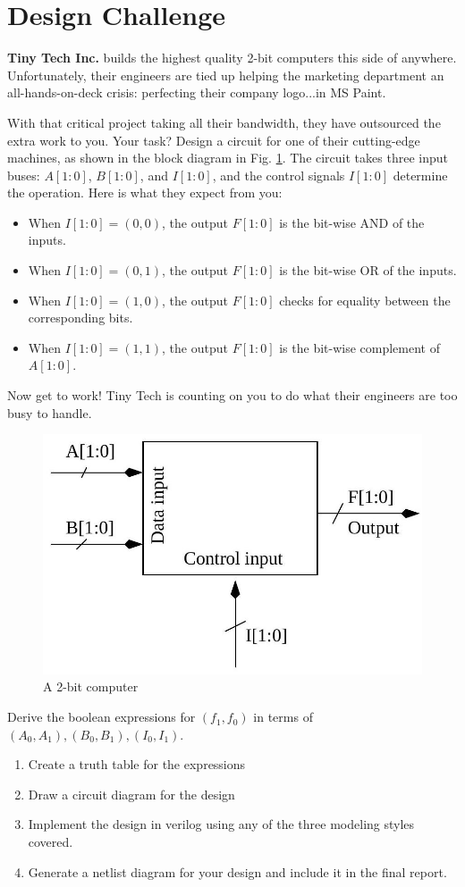 \documentclass[12pt]{labmanual}
\begin{document}
\section{Design Challenge}


\textbf{Tiny Tech Inc.} builds the highest quality 2-bit computers this side of anywhere. Unfortunately, their engineers are tied up helping the marketing department an all-hands-on-deck crisis: perfecting their company logo...in MS Paint.

With that critical project taking all their bandwidth, they have outsourced the extra work to you. Your task? Design a circuit for one of their cutting-edge machines, as shown in the block diagram in Fig. \ref{fig:2bitblock}. The circuit takes three input buses: \(A[1:0]\), \(B[1:0]\), and \(I[1:0]\), and the control signals \(I[1:0]\) determine the operation. Here is what they expect from you:

\begin{itemize}
  \item When \(I[1:0] = (0,0)\), the output \(F[1:0]\) is the bit-wise AND of the inputs.
  \item When \(I[1:0] = (0,1)\), the output \(F[1:0]\) is the bit-wise OR of the inputs.
  \item When \(I[1:0] = (1,0)\), the output \(F[1:0]\) checks for equality between the corresponding bits.
  \item When \(I[1:0] = (1,1)\), the output \(F[1:0]\) is the bit-wise complement of \(A[1:0]\).
\end{itemize}

Now get to work! Tiny Tech is counting on you to do what their engineers are too busy to handle.

\begin{figure}
    \centering
    \includegraphics[width=0.5\linewidth]{2024_09_05_b54c49500848b4490d27g-2.jpg}
    \caption{A 2-bit computer}
    \label{fig:2bitblock}
\end{figure}

\begin{question}
    Derive the boolean expressions for $(f_1, f_0)$ in terms of $(A_0, A_1), (B_0, B_1), (I_0, I_1)$.
    \begin{enumerate}
        \item Create a truth table for the expressions
        \item Draw a circuit diagram for the design
        \item Implement the design in verilog using any of the three modeling styles covered.
        \item Generate a netlist diagram for your design and include it in the final report.
    \end{enumerate}
\end{question}
\end{document}
